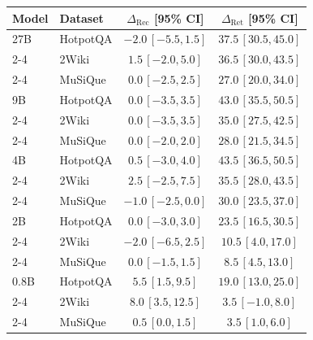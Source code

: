 \begin{tabular}{|l|l|c|c|}
\hline
Model & Dataset & $\Delta_{\mathrm{Rec}}$ [95\% CI] & $\Delta_{\mathrm{Ret}}$ [95\% CI] \\
\hline
27B & HotpotQA & $-2.0$\,$[-5.5, 1.5]$ & $37.5$\,$[30.5, 45.0]$ \\ %
\cline{2-4}
 & 2Wiki & $1.5$\,$[-2.0, 5.0]$ & $36.5$\,$[30.0, 43.5]$ \\ %
\cline{2-4}
 & MuSiQue & $0.0$\,$[-2.5, 2.5]$ & $27.0$\,$[20.0, 34.0]$ \\ %
\hline
9B & HotpotQA & $0.0$\,$[-3.5, 3.5]$ & $43.0$\,$[35.5, 50.5]$ \\ %
\cline{2-4}
 & 2Wiki & $0.0$\,$[-3.5, 3.5]$ & $35.0$\,$[27.5, 42.5]$ \\ %
\cline{2-4}
 & MuSiQue & $0.0$\,$[-2.0, 2.0]$ & $28.0$\,$[21.5, 34.5]$ \\ %
\hline
4B & HotpotQA & $0.5$\,$[-3.0, 4.0]$ & $43.5$\,$[36.5, 50.5]$ \\ %
\cline{2-4}
 & 2Wiki & $2.5$\,$[-2.5, 7.5]$ & $35.5$\,$[28.0, 43.5]$ \\ %
\cline{2-4}
 & MuSiQue & $-1.0$\,$[-2.5, 0.0]$ & $30.0$\,$[23.5, 37.0]$ \\ %
\hline
2B & HotpotQA & $0.0$\,$[-3.0, 3.0]$ & $23.5$\,$[16.5, 30.5]$ \\ %
\cline{2-4}
 & 2Wiki & $-2.0$\,$[-6.5, 2.5]$ & $10.5$\,$[4.0, 17.0]$ \\ %
\cline{2-4}
 & MuSiQue & $0.0$\,$[-1.5, 1.5]$ & $8.5$\,$[4.5, 13.0]$ \\ %
\hline
0.8B & HotpotQA & $5.5$\,$[1.5, 9.5]$ & $19.0$\,$[13.0, 25.0]$ \\ %
\cline{2-4}
 & 2Wiki & $8.0$\,$[3.5, 12.5]$ & $3.5$\,$[-1.0, 8.0]$ \\ %
\cline{2-4}
 & MuSiQue & $0.5$\,$[0.0, 1.5]$ & $3.5$\,$[1.0, 6.0]$ \\ %
\hline
\end{tabular}
